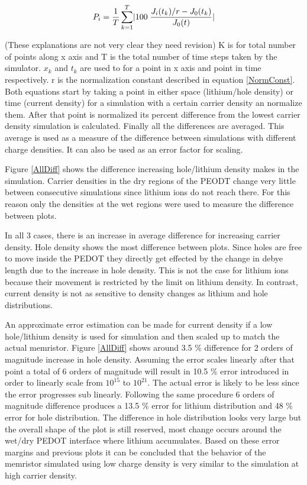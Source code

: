 {\begin{equation}
\centering
P_i = \frac{1}{ T}\sum_{k=1}^{T}\lvert 100 \;\frac{J_{i}(t_k)/r-J_{0}(t_k)}{J_{0}(t)}\rvert
\end{equation}

(These explanations are not very clear they need revision)
K is for total number of points along x axis and T is the total number of time steps taken by the simulator. $x_{k}$ and $t_{k}$ are used to for a point in x axis and point in time respectively. r is the normalization constant described in equation \ref{NormConst}. Both equations start by taking a point in either space (lithium/hole density) or time (current density) for a simulation with a certain carrier density an normalize them. After that point is normalized its percent difference from the lowest carrier density simulation is calculated. Finally all the differences are averaged. This average is used as a measure of the difference between simulations with different charge densities. It can also be used as an error factor for scaling.  

Figure \ref{AllDiff} shows the difference increasing hole/lithium density makes in the simulation. Carrier densities in the dry regions of the PEODT change very little between consecutive simulations since lithium ions do not reach there. For this reason only the densities at the wet regions were used to measure the difference between plots. 

In all 3 cases, there is an increase in average difference for increasing carrier density. Hole density shows the most difference between plots. Since holes are free to move inside the PEDOT they directly get effected by the change in debye length due to the increase in hole density. This is not the case for lithium ions because their movement is restricted by the limit on lithium density. In contrast, current density is not as sensitive to density changes as lithium and hole distributions.

 An approximate error estimation can be made for current density if a low hole/lithium density is used for simulation and then scaled up to match the actual memristor. Figure \ref{AllDiff} shows around 3.5 \% difference for 2 orders of magnitude increase in hole density. Assuming the error scales linearly after that point a total of 6 orders of magnitude will result in 10.5 \% error introduced in order to linearly scale from $10^{15}$ to $10^{21}$. The actual error is likely to be less since the error progresses sub linearly. Following the same procedure 6 orders of magnitude difference produces a 13.5 \% error for lithium distribution and 48 \% error for hole distribution. The difference in hole distribution looks very large but the overall shape of the plot is still reserved, most change occurs around the wet/dry PEDOT interface where lithium accumulates. Based on these error margins and previous plots it can be concluded that the behavior of the memristor simulated using low charge density is very similar to the simulation at high carrier density.    


}
